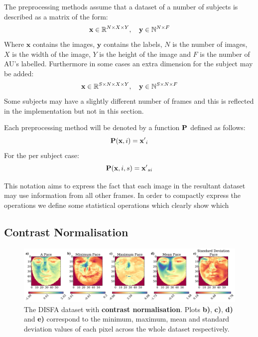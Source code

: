     The preprocessing methods assume that a dataset of a number of subjects
    is described as a matrix of the form:
    \begin{equation}
    {\bf x} \in \mathbb{R}^{N\times X \times Y},\quad {\bf y} \in \mathbb{N}^{N\times F}
    \end{equation}
    Where $\mathbf{x}$ contains the images, $\mathbf{y}$ contains the labels,
    $N$ is the number of images, $X$ is the width of the image, $Y$ is the height of the
    image and $F$ is the number of AU's labelled. Furthermore in some cases an extra dimension
    for the subject may be added:
    \begin{equation}
    {\bf x} \in \mathbb{R}^{S\times N\times X \times Y},\quad {\bf y} \in \mathbb{N}^{S\times N\times F}
    \end{equation}
    Some subjects may have a slightly different number of frames and this is reflected
    in the implementation but not in this section.

    Each preprocessing method will be denoted by a function ${\bf P}$ defined as follows:
    \begin{equation}
      {\bf P}({\bf x},i) = {\bf x'}_i
    \end{equation}
    For the per subject case:
    \begin{equation}
      {\bf P}({\bf x},i,s) = {\bf x'}_{si}
    \end{equation}

    This notation aims to express the fact that each image in the resultant dataset
    may use information from all other frames. In order to compactly express the operations
    we define some statistical operations which clearly show which

    \subsection{Contrast Normalisation}
      \begin{figure}[!h]
      \centering
      \includegraphics[width =\hsize]{figures/faces_contrast.pdf}
      \caption{The DISFA dataset with {\bf contrast normalisation}.
      Plots {\bf b)}, {\bf c)}, {\bf d)} and {\bf e)} correspond to the minimum,
      maximum, mean and standard deviation values of each pixel across the whole
      dataset respectively.}
      \label{fig:simple}
      \end{figure}

